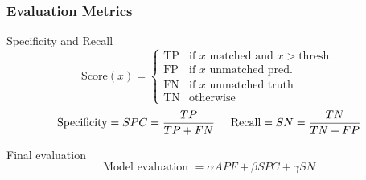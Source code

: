 \documentclass[10pt]{beamer}
\begin{document}
\begin{frame}
  \frametitle{Evaluation Metrics}
  \begin{block}{Specificity and Recall}
    \[
    \text{Score}(x) = 
    \begin{cases} 
      \text{TP} & \text{if }x \text{ matched and } x > \text{thresh.} \\
      \text{FP} & \text{if }x \text{ unmatched pred.} \\
      \text{FN} & \text{if }x \text{ unmatched truth} \\
      \text{TN} & \text{otherwise}
    \end{cases}
    \]
    \begin{equation*}
      \text{Specificity} = SPC = \frac{TP}{TP+FN} \hspace{5mm} \text{Recall} = SN = \frac{TN}{TN+FP}
    \end{equation*}
  \end{block}
  \begin{block}{Final evaluation}
    \begin{equation*}
      \text{Model evaluation } = \alpha APF + \beta SPC + \gamma SN 
    \end{equation*}
  \end{block}
\end{frame}
\end{document}
